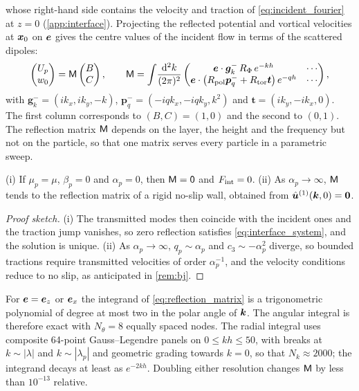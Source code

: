 whose right-hand side contains the velocity and traction of \cref{eq:incident_fourier} at $z=0$ (\cref{app:interface}).
Projecting the reflected potential and vortical velocities at $\bm{x}_0$ on $\bm{e}$ gives the centre values of the incident
flow in terms of the scattered dipoles:
\begin{equation}
  \begin{pmatrix}U_p\\ w_0\end{pmatrix}=\mathsf{M}\begin{pmatrix}B\\ C\end{pmatrix},\qquad
  \mathsf{M}=\int\!\frac{\mathrm{d}^2k}{(2\pi)^2}
  \begin{pmatrix}
    \bm{e}\cdot\bm g_k^-\,R_\Phi\,e^{-kh} & \cdots\\
    \bm{e}\cdot\left(R_{\rm pol}\bm p_q^-+R_{\rm tor}\bm t\right)e^{-qh} & \cdots
  \end{pmatrix},
  \label{eq:reflection_matrix}
\end{equation}
with $\bm g_k^-=(ik_x,ik_y,-k)$, $\bm p_q^-=(-iqk_x,-iqk_y,k^2)$ and $\bm t=(ik_y,-ik_x,0)$. The first column
corresponds to $(B,C)=(1,0)$ and the second to $(0,1)$. The reflection matrix $\mathsf{M}$ depends on the layer, the height and
the frequency but not on the particle, so that one matrix serves every particle in a parametric sweep.

\begin{proposition}\label{prop:limits}
(i) If $\mu_p=\mu$, $\beta_p=0$ and $\alpha_p=0$, then $\mathsf{M}=\mathsf 0$ and $F_{\rm int}=0$. (ii) As $\alpha_p\to\infty$,
$\mathsf{M}$ tends to the reflection matrix of a rigid no-slip wall, obtained from $\hat{\bm{u}}^{(1)}(\bm{k},0)=\bm 0$.
\end{proposition}
\begin{proof}[Proof sketch]
(i) The transmitted modes then coincide with the incident ones and the traction jump vanishes, so zero reflection
satisfies \cref{eq:interface_system}, and the solution is unique. (ii) As $\alpha_p\to\infty$, $q_p\sim\alpha_p$ and
$c_3\sim-\alpha_p^2$ diverge, so bounded tractions require transmitted velocities of order $\alpha_p^{-1}$, and the
velocity conditions reduce to no slip, as anticipated in \cref{rem:bj}.
\end{proof}

For $\bm{e}=\bm{e}_z$ or $\bm{e}_x$ the integrand of \cref{eq:reflection_matrix} is a trigonometric polynomial of degree at most
two in the polar angle of $\bm{k}$. The angular integral is therefore exact with $N_\theta=8$ equally spaced nodes. The
radial integral uses composite 64-point Gauss--Legendre panels on $0\le kh\le50$, with breaks at $k\sim|\lambda|$ and
$k\sim|\lambda_p|$ and geometric grading towards $k=0$, so that $N_k\approx2000$; the integrand decays at least as
$e^{-2kh}$. Doubling either resolution changes $\mathsf{M}$ by less than $10^{-13}$ relative.

